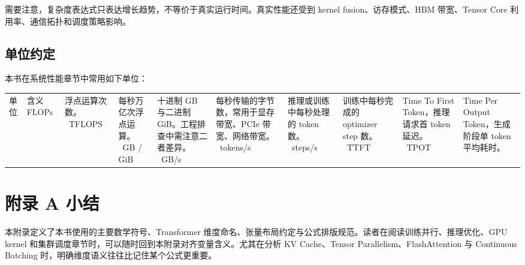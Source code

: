 需要注意，复杂度表达式只表达增长趋势，不等价于真实运行时间。真实性能还受到 kernel fusion、访存模式、HBM 带宽、Tensor Core 利用率、通信拓扑和调度策略影响。

\subsection{单位约定}

本书在系统性能章节中常用如下单位：

\begin{longtable}{p{}p{}}
\toprule
单位 & 含义 \
\midrule
FLOPs & 浮点运算次数。 \
TFLOPS & 每秒万亿次浮点运算。 \
GB / GiB & 十进制 GB 与二进制 GiB。工程排查中需注意二者差异。 \
GB/s & 每秒传输的字节数，常用于显存带宽、PCIe 带宽、网络带宽。 \
tokens/s & 推理或训练中每秒处理的 token 数。 \
steps/s & 训练中每秒完成的 optimizer step 数。 \
TTFT & Time To First Token，推理请求首 token 延迟。 \
TPOT & Time Per Output Token，生成阶段单 token 平均耗时。 \
\bottomrule
\end{longtable}

\section{附录 A 小结}

本附录定义了本书使用的主要数学符号、Transformer 维度命名、张量布局约定与公式排版规范。读者在阅读训练并行、推理优化、GPU kernel 和集群调度章节时，可以随时回到本附录对齐变量含义。尤其在分析 KV Cache、Tensor Parallelism、FlashAttention 与 Continuous Batching 时，明确维度语义往往比记住某个公式更重要。

